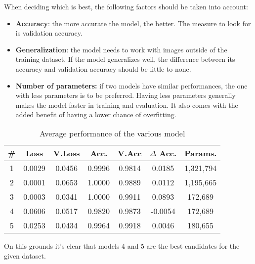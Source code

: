 
When deciding which is best, the following factors should be taken into account:
\begin{itemize}
\item \textbf{Accuracy}: the more accurate the model, the better. The measure to look for is validation accuracy.
\item \textbf{Generalization}: the model needs to work with images outside of the training dataset. If the model generalizes well, the difference between its accuracy and validation accuracy should be little to none.
\item \textbf{Number of parameters:} if two models have similar performances, the one with less parameters is to be preferred. Having less parameters generally makes the model faster in training and evaluation. It also comes with the added benefit of having a lower chance of overfitting.
\end{itemize}

\begin{table}[H]
	\centering
	\begin{tabular}{ccc cccc}
	\textbf{\#} & \textbf{Loss} & \textbf{V.Loss} & \textbf{Acc.} & \textbf{V.Acc} & \textbf{$\Delta$ Acc.} & \textbf{Params.}\\ \hline
	1 & 0.0029 & 0.0456 & 0.9996 & 0.9814 & 0.0185 & 1,321,794\\ 
	2 & 0.0001 & 0.0653 & 1.0000	& 0.9889 & 0.0112 & 1,195,665\\
	3 & 0.0003 & 0.0341 & 1.0000 & 0.9911 & 0.0893 & 172,689\\
	4 & 0.0606 & 0.0517 & 0.9820 & 0.9873 & -0.0054 & 172,689\\
	5 & 0.0253 & 0.0434 & 0.9964 & 0.9918 & 0.0046 & 180,655\\
	\end{tabular}
	\caption{Average performance of the various model}
\end{table}

On this grounds it's clear that models 4 and 5 are the best candidates for the given dataset.